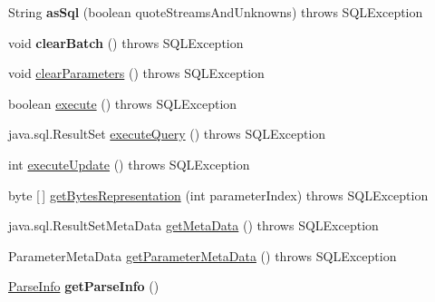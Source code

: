 \begin{DoxyCompactItemize}
\item 
\mbox{\label{classcom_1_1mysql_1_1cj_1_1jdbc_1_1_client_prepared_statement_a0e325f7e413b98f1b9cc92d5b6e212d1}} 
String {\bfseries as\+Sql} (boolean quote\+Streams\+And\+Unknowns)  throws S\+Q\+L\+Exception 
\item 
\mbox{\label{classcom_1_1mysql_1_1cj_1_1jdbc_1_1_client_prepared_statement_ad99b56ea5ee5daf5c72806771382d21d}} 
void {\bfseries clear\+Batch} ()  throws S\+Q\+L\+Exception 
\item 
void \mbox{\hyperlink{classcom_1_1mysql_1_1cj_1_1jdbc_1_1_client_prepared_statement_ac5cdbe167c97f7e988f168974c07320f}{clear\+Parameters}} ()  throws S\+Q\+L\+Exception 
\item 
boolean \mbox{\hyperlink{classcom_1_1mysql_1_1cj_1_1jdbc_1_1_client_prepared_statement_aa56b43407e27aeea76e689e2663014e2}{execute}} ()  throws S\+Q\+L\+Exception 
\item 
java.\+sql.\+Result\+Set \mbox{\hyperlink{classcom_1_1mysql_1_1cj_1_1jdbc_1_1_client_prepared_statement_a3c87e86e004b4f406cef86e3738546b8}{execute\+Query}} ()  throws S\+Q\+L\+Exception 
\item 
int \mbox{\hyperlink{classcom_1_1mysql_1_1cj_1_1jdbc_1_1_client_prepared_statement_a71cd036bccd4ec78a85b861e4a548e1f}{execute\+Update}} ()  throws S\+Q\+L\+Exception 
\item 
byte \mbox{[}$\,$\mbox{]} \mbox{\hyperlink{classcom_1_1mysql_1_1cj_1_1jdbc_1_1_client_prepared_statement_a75034efc58565c3b3e5b8bcced7db9eb}{get\+Bytes\+Representation}} (int parameter\+Index)  throws S\+Q\+L\+Exception 
\item 
java.\+sql.\+Result\+Set\+Meta\+Data \mbox{\hyperlink{classcom_1_1mysql_1_1cj_1_1jdbc_1_1_client_prepared_statement_ae1f37a264e7a4a58d3f57bed796b1b38}{get\+Meta\+Data}} ()  throws S\+Q\+L\+Exception 
\item 
Parameter\+Meta\+Data \mbox{\hyperlink{classcom_1_1mysql_1_1cj_1_1jdbc_1_1_client_prepared_statement_aa3c5258b8ab6b147f5d24606d121f7d9}{get\+Parameter\+Meta\+Data}} ()  throws S\+Q\+L\+Exception 
\item 
\mbox{\label{classcom_1_1mysql_1_1cj_1_1jdbc_1_1_client_prepared_statement_a0983ede42add411efe5197093530698a}} 
\mbox{\hyperlink{classcom_1_1mysql_1_1cj_1_1_parse_info}{Parse\+Info}} {\bfseries get\+Parse\+Info} ()

\end{DoxyCompactItemize}
